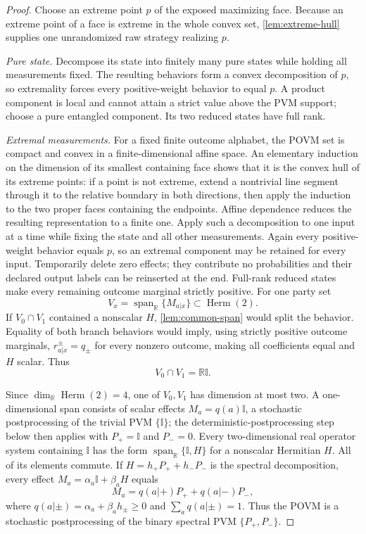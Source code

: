 \documentclass[11pt]{article}
\theoremstyle{definition}
\newcommand{\Herm}{\operatorname{Herm}}
\newcommand{\id}{\mathbb I}
\newcommand{\R}{\mathbb R}
\begin{document}
\begin{proof}
Choose an extreme point \(p\) of the exposed maximizing face. Because an
extreme point of a face is extreme in the whole convex set,
\cref{lem:extreme-hull} supplies one unrandomized raw strategy realizing
\(p\).

\emph{Pure state.} Decompose its state into finitely many pure states while
holding all measurements fixed. The resulting behaviors form a convex
decomposition of \(p\), so extremality forces every positive-weight behavior
to equal \(p\). A product component is local and cannot attain a strict value
above the PVM support; choose a pure entangled component. Its two reduced
states have full rank.

\emph{Extremal measurements.} For a fixed finite outcome alphabet, the POVM
set is compact and convex in a finite-dimensional affine space. An elementary
induction on the dimension of its smallest containing face shows that it is
the convex hull of its extreme points: if a point is not extreme, extend a
nontrivial line segment through it to the relative boundary in both
directions, then apply the induction to the two proper faces containing the
endpoints. Affine dependence reduces the resulting representation to a
finite one. Apply such a decomposition to one input at a time while fixing
the state and all other measurements. Again every positive-weight behavior
equals \(p\), so an extremal component may be retained for every input.
Temporarily delete zero effects; they contribute no probabilities and their
declared output labels can be reinserted at the end. Full-rank reduced states
make every remaining outcome marginal strictly positive.
For one party set
\[
V_x=\operatorname{span}_{\R}\{M_{a|x}\}\subset\Herm(2).
\]
If \(V_0\cap V_1\) contained a nonscalar \(H\), \cref{lem:common-span} would
split the behavior. Equality of both branch behaviors would imply, using
strictly positive outcome marginals,
\(r^\pm_{a|x}=q_\pm\) for every nonzero outcome, making all coefficients
equal and \(H\) scalar. Thus
\[
V_0\cap V_1=\R\id.
\]

Since \(\dim_{\R}\Herm(2)=4\), one of \(V_0,V_1\) has dimension at most two.
A one-dimensional span consists of scalar effects \(M_a=q(a)\id\), a stochastic
postprocessing of the trivial PVM \(\{\id\}\); the deterministic-postprocessing
step below then applies with \(P_+=\id\) and \(P_-=0\).
Every two-dimensional real operator system containing \(\id\) has the form
\(\operatorname{span}_{\R}\{\id,H\}\) for a nonscalar Hermitian \(H\).
All of its elements commute. If
\(H=h_+P_++h_-P_-\) is the spectral decomposition, every effect
\(M_a=\alpha_a\id+\beta_aH\) equals
\[
M_a=q(a|+)P_++q(a|-)P_-,
\]
where \(q(a|\pm)=\alpha_a+\beta_a h_\pm\ge0\) and
\(\sum_aq(a|\pm)=1\). Thus the POVM is a stochastic postprocessing of the
binary spectral PVM \(\{P_+,P_-\}\).


\end{proof}
\end{document}

